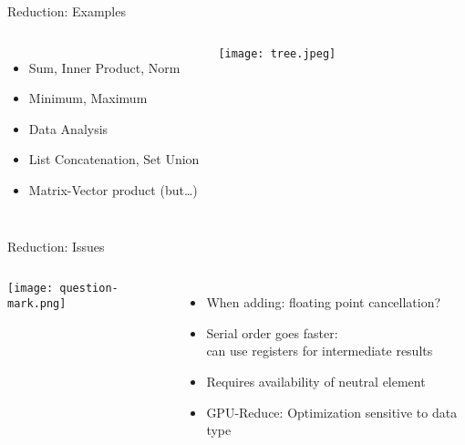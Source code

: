 \documentclass[english,compress]{beamer}
\begin{document}
\begin{frame}{Reduction: Examples}
  \begin{columns}
      \begin{itemize}
        \item Sum, Inner Product, Norm
        \item Minimum, Maximum
        \item Data Analysis
        \item List Concatenation, Set Union
        \item Matrix-Vector product (but\dots)
      \end{itemize}
      \texttt{[image: tree.jpeg]}
  \end{columns}
\end{frame}
\begin{frame}{Reduction: Issues}
  \begin{columns}
      \texttt{[image: question-mark.png]}
      \begin{itemize}
        \item When adding: floating point cancellation?
        \item Serial order goes faster:\\ can use registers for intermediate results
        \item Requires availability of neutral element
        \item GPU-Reduce: Optimization sensitive to data type
      \end{itemize}
  \end{columns}
\end{frame}
\end{document}
